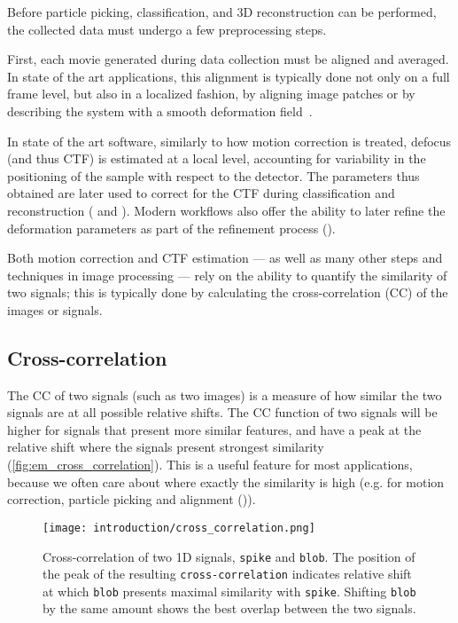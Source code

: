 Before particle picking, classification, and 3D reconstruction can be performed, the collected data must undergo a few preprocessing steps.

First, each movie generated during data collection must be aligned and averaged.
In state of the art applications, this alignment is typically done not only on a full frame level, but also in a localized fashion, by aligning image patches or by describing the system with a smooth deformation field~\cite{zhengMotionCor2AnisotropicCorrection2017,punjaniCryoSPARCAlgorithmsRapid2017,tegunovRealtimeCryoelectronMicroscopy2019}.

In state of the art software, similarly to how motion correction is treated, defocus (and thus CTF) is estimated at a local level, accounting for variability in the positioning of the sample with respect to the detector.
The parameters thus obtained are later used to correct for the CTF during classification and reconstruction ( and ).
Modern workflows also offer the ability to later refine the deformation parameters as part of the refinement process ().

Both motion correction and CTF estimation --- as well as many other steps and techniques in image processing --- rely on the ability to quantify the similarity of two signals; this is typically done by calculating the cross-correlation (CC) of the images or signals.

\subsection{Cross-correlation}\label{em_cross_correlation}

The CC of two signals (such as two images) is a measure of how similar the two signals are at all possible relative shifts.
The CC function of two signals will be higher for signals that present more similar features, and have a peak at the relative shift where the signals present strongest similarity (\autoref{fig:em_cross_correlation}).
This is a useful feature for most applications, because we often care about where exactly the similarity is high (e.g. for motion correction, particle picking and alignment ()).

\begin{figure}[ht]
    \centering
    \texttt{[image: introduction/cross\_correlation.png]}
    \caption[Cross-correlation of 1D signals]{Cross-correlation of two 1D signals, \texttt{spike} and \texttt{blob}. The position of the peak of the resulting \texttt{cross-correlation} indicates relative shift at which \texttt{blob} presents maximal similarity with \texttt{spike}. Shifting \texttt{blob} by the same amount shows the best overlap between the two signals.}
    \label{fig:em_cross_correlation}
\end{figure}

